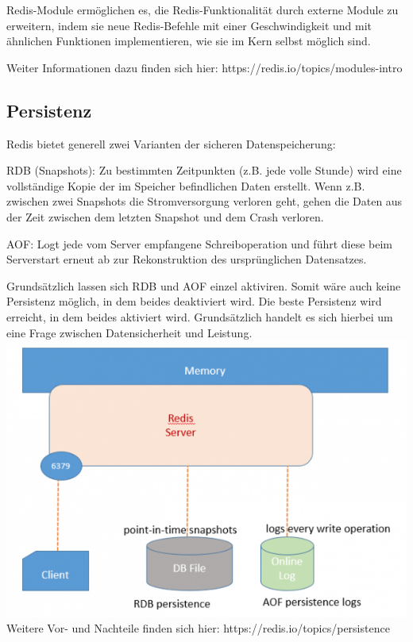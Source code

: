 Redis-Module ermöglichen es, die Redis-Funktionalität durch externe Module zu erweitern, indem sie neue Redis-Befehle mit einer Geschwindigkeit und mit ähnlichen Funktionen implementieren, wie sie im Kern selbst möglich sind.

Weiter Informationen dazu finden sich hier: https://redis.io/topics/modules-intro
\clearpage
\subsection{Persistenz}
Redis bietet generell zwei Varianten der sicheren Datenspeicherung:

RDB (Snapshots): Zu bestimmten Zeitpunkten (z.B. jede volle Stunde) wird eine vollständige Kopie der im Speicher befindlichen Daten erstellt. Wenn z.B. zwischen zwei Snapshots die Stromversorgung verloren geht, gehen die Daten aus der Zeit zwischen dem letzten Snapshot und dem Crash verloren. 

AOF: Logt jede vom Server empfangene Schreiboperation und führt diese beim Serverstart erneut ab zur Rekonstruktion des ursprünglichen Datensatzes.

Grundsätzlich lassen sich RDB und AOF einzel aktiviren. Somit wäre auch keine Persistenz möglich, in dem beides deaktiviert wird. Die beste Persistenz wird erreicht, in dem beides aktiviert wird. Grundsätzlich handelt es sich hierbei um eine Frage zwischen Datensicherheit und Leistung.\\

\includegraphics[width=160mm]{media/redis.png}\\[10mm]	
Weitere Vor- und Nachteile finden sich hier: https://redis.io/topics/persistence
\clearpage
